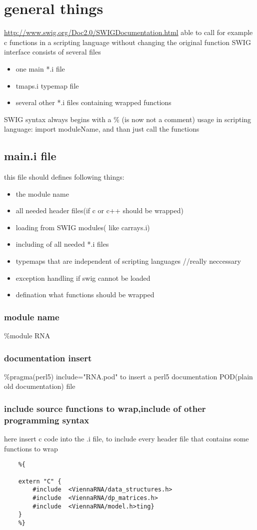 \documentclass[ twoside,openright,titlepage,numbers=noenddot,headinclude,
                footinclude=true, cleardoublepage=empty,abstractoff, 
                BCOR=5mm,paper=a4,fontsize=11pt,
                ngerman,american,
                ]{scrreprt} %
\begin{document}
\chapter{general things}
\url{http://www.swig.org/Doc2.0/SWIGDocumentation.html}
able to call for example c functions in a scripting language without changing the original function
SWIG interface consists of several files
\begin{itemize}
	\item one main *.i file
	\item tmaps.i typemap file	
	\item several other *.i files containing wrapped functions
\end{itemize}

SWIG syntax always begins with a \% (is now not a comment)
usage in scripting language:  import moduleName,  and than just call the functions

\section{main.i file}
this file should defines following things:
\begin{itemize}
	\item the module name
	\item all needed header files(if c or c++ should be wrapped)
	\item loading from SWIG modules( like carrays.i)
	\item including of all needed *.i files
	\item typemaps that are independent of scripting languages //really neccessary
	\item exception handling if swig cannot be loaded
	\item defination what functions should be wrapped
\end{itemize}

\subsection{module name}
	\%module RNA
\subsection{documentation insert}
	\%pragma(perl5) include="RNA.pod" 
	to insert a perl5 documentation POD(plain old documentation) file 
\subsection{include source functions to wrap,include of other programming syntax} \label{subsec:source functions}
	here insert c code into the .i file, to include every header file that contains some functions to wrap	
	\begin{lstlisting}
	%{

	extern "C" {
		#include  <ViennaRNA/data_structures.h>
		#include  <ViennaRNA/dp_matrices.h>
		#include  <ViennaRNA/model.h>ting}
	}
	%}
	
	\end{lstlisting}
	
\end{document}
